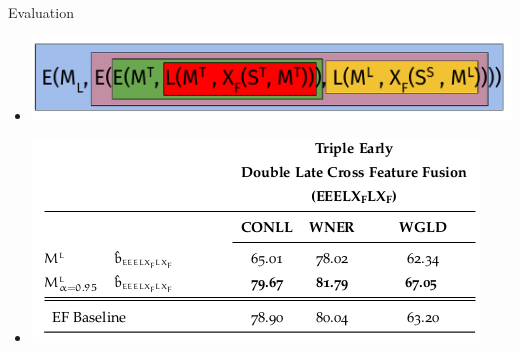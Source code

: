 \documentclass[10pt,xcolor=table]{beamer}
\begin{document}
\begin{frame}[t]{Evaluation}




\begin{center}
\begin{itemize}
\item[] \includegraphics[width=1\linewidth]{image2/Chapitre2/hybrid_fusiona_trim.pdf}%
\item[] \includegraphics[width=1\linewidth]{image2/Chapitre4/hf_trim.png}
\end{itemize}




\end{center}



\vspace{\textheight}
\end{frame}
\end{document}
